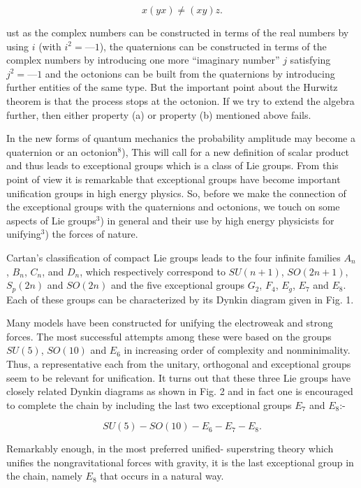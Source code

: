 $$
x(yx) \neq (xy)z.
$$


ust as the complex numbers can be constructed in terms of the real numbers by using
$i$ (with $i^{2} = —1$), the quaternions can be constructed in terms of the complex numbers
by introducing one more “imaginary number” $j$ satisfying $j^{2} = —1$ and the octonions can
be built from the quaternions by introducing further entities of the same type. But the
important point about the Hurwitz theorem is that the process stops at the octonion. If
we try to extend the algebra further, then either property (a) or property (b) mentioned
above fails.


In the new forms of quantum mechanics the probability amplitude may become a
quaternion or an octonion$^{8}$), This will call for a new definition of scalar product and thus
leads to exceptional groups which is a class of Lie groups. From this point of view it
is remarkable that exceptional groups have become important unification groups in high
energy physics.
So, before we make the connection of the exceptional groups with the
quaternions and octonions, we touch on some aspects of Lie groups$^3$) in general and their
use by high energy physicists for unifying$^3$) the forces of nature.

Cartan’s classification of compact Lie groups leads to the four infinite families $A_{n}$, $B_{n}$,
$C_{n}$, and $D_{n}$, which respectively correspond to $SU(n +1)$, $SO(2n +1)$, $S_{p}(2n)$ and $SO(2n)$
and the five exceptional groups $G_{2}$, $F_{4}$, $E_{g}$, $E_{7}$ and $E_{8}$. Each of these groups can be
characterized by its Dynkin diagram given in Fig. 1.

Many models have been constructed for unifying the electroweak and strong forces.
The most successful attempts among these were based on the groups $SU(5)$, $SO(10)$ and
$E_{6}$ in increasing order of complexity and nonminimality. Thus, a representative each from
the unitary, orthogonal and exceptional groups seem to be relevant for unification. It turns
out that these three Lie groups have closely related Dynkin diagrams as shown in Fig. 2
and in fact one is encouraged to complete the chain by including the last two exceptional
groups $E_{7}$ and $E_{8}$:-

$$
SU(5) - SO(10)-E_{6}-E_{7}-E_{8}.
$$

Remarkably enough, in the most preferred unified- superstring theory which unifies the
nongravitational forces with gravity, it is the last exceptional group in the chain, namely
$E_{8}$ that occurs in a natural way.


